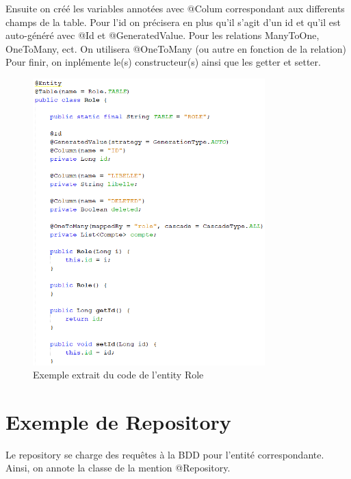 		\noindent
		Ensuite on créé les variables annotées avec @Colum correspondant aux differents champs de la table. \newline
		Pour l'id on précisera en plus qu'il s'agit d'un id et qu'il est auto-généré avec @Id et @GeneratedValue.\newline
		Pour les relations ManyToOne, OneToMany, ect. On utilisera @OneToMany (ou autre en fonction de la relation)\newline
		Pour finir, on inplémente le(s) constructeur(s) ainsi que les getter et setter.

		\begin{figure}[H]
			\centering\includegraphics[width=0.80\textwidth, keepaspectratio]{res/entity.png}
			\caption{Exemple extrait du code de l'entity Role}
		\end{figure}

	\section{Exemple de Repository}
		Le repository se charge des requêtes à la BDD pour l’entité correspondante.\newline
		Ainsi, on annote la classe de la mention @Repository. \newline

